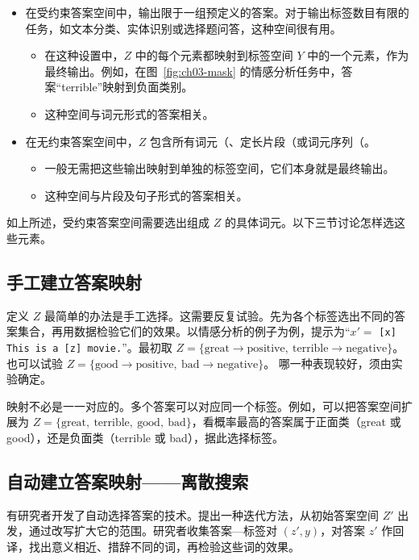 \begin{keypoint}
\begin{itemize}
\item 在受约束答案空间中，输出限于一组预定义的答案。对于输出标签数目有限的任务，如文本分类、实体识别或选择题问答，这种空间很有用。
  \begin{itemize}
  \item 在这种设置中，$Z$ 中的每个元素都映射到标签空间 $Y$ 中的一个元素，作为最终输出。例如，在图~\ref{fig:ch03-mask} 的情感分析任务中，答案“terrible”映射到负面类别。
  \item 这种空间与词元形式的答案相关。
  \end{itemize}
\item 在无约束答案空间中，$Z$ 包含所有词元（、定长片段（或词元序列（。
  \begin{itemize}
  \item 一般无需把这些输出映射到单独的标签空间，它们本身就是最终输出。
  \item 这种空间与片段及句子形式的答案相关。
  \end{itemize}
\end{itemize}
\end{keypoint}

如上所述，受约束答案空间需要选出组成 $Z$ 的具体词元。以下三节讨论怎样选这些元素。

\subsection{手工建立答案映射}
定义 $Z$ 最简单的办法是手工选择。这需要反复试验。先为各个标签选出不同的答案集合，再用数据检验它们的效果。以情感分析的例子为例，提示为“$x'=$ \texttt{[x] This is a [z] movie.}”。最初取
$Z=\{\text{great}\to\text{positive},\ \text{terrible}\to\text{negative}\}$。
也可以试验
$Z=\{\text{good}\to\text{positive},\ \text{bad}\to\text{negative}\}$。
哪一种表现较好，须由实验确定。

映射不必是一一对应的。多个答案可以对应同一个标签。例如，可以把答案空间扩展为 $Z=\{\text{great},\ \text{terrible},\ \text{good},\ \text{bad}\}$，看概率最高的答案属于正面类（great 或 good），还是负面类（terrible 或 bad），据此选择标签。

\subsection{自动建立答案映射——离散搜索}
有研究者开发了自动选择答案的技术。提出一种迭代方法，从初始答案空间 $Z'$ 出发，通过改写扩大它的范围。研究者收集答案—标签对 $(z',y)$，对答案 $z'$ 作回译，找出意义相近、措辞不同的词，再检验这些词的效果。


